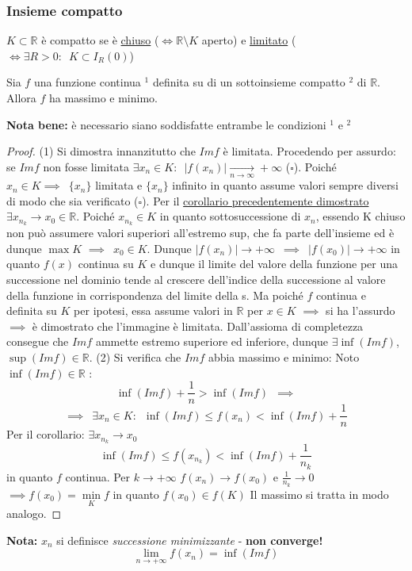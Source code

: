 \documentclass[10pt, oneside]{book}
\theoremstyle{plain}
\begin{document}
\subsubsection{Insieme compatto}
\begin{defin}
$K \subset \mathbb{R}$ è compatto se è \underline{chiuso} ($\Leftrightarrow \mathbb{R} \setminus K$ aperto) e \underline{limitato} ($\Leftrightarrow \exists R > 0 : \enspace K \subset I_R(0)$)
\end{defin}
\hypertarget{weierstrass}{\begin{ther}
Sia $f$ una funzione continua $^1$ definita su di un sottoinsieme compatto $^2$ di $\mathbb{R}$. 
Allora $f$ ha massimo e minimo.
\end{ther}}
\textbf{Nota bene: } è necessario siano soddisfatte entrambe le condizioni $^1$ e $^2$
\begin{proof}
    (1) Si dimostra innanzitutto che $Im f$ è limitata. Procedendo per assurdo: se $Im f$ non fosse limitata $\exists x_n \in K : \enspace |f(x_n)| \xrightarrow[n \rightarrow \infty]{} + \infty$ ($\square$).
    Poiché $x_n \in K \implies \enspace \{x_n\}$ limitata e $\{x_n\}$ infinito in quanto assume valori sempre diversi di modo che sia verificato ($\square$). Per il \hyperlink{corollaier}{corollario precedentemente dimostrato} $\exists x_{n_k} \rightarrow x_0 \in \mathbb{R}$. \newline Poiché $x_{n_k} \in K$ in quanto sottosuccessione di $x_n$, essendo K chiuso non può assumere valori superiori all'estremo sup, che fa parte dell'insieme ed è dunque $\max K$ $\implies \enspace x_0 \in K$. 
    \newline Dunque $|f(x_n)| \longrightarrow + \infty \enspace \implies \enspace |f(x_0)| \longrightarrow + \infty$ in quanto $f(x)$ continua su $K$ e dunque il limite del valore della funzione per una successione nel dominio tende al crescere dell'indice della successione al valore della funzione in corrispondenza del limite della s. Ma poiché $f$ continua e definita su $K$ per ipotesi, essa assume valori in $\mathbb{R}$ per $x \in K$ $\implies$ si ha l'assurdo $\implies$ è dimostrato che l'immagine è limitata. \newline 
    Dall'assioma di completezza consegue che $Im f$ ammette estremo superiore ed inferiore, dunque $\exists \inf(Im f)$, $\sup(Im f) \in \mathbb{R}$. \newline
    (2) Si verifica che $Im f$ abbia massimo e minimo: \newline
    Noto $\inf(Im f) \in \mathbb{R}$ :
    \[\inf(Im f) + \frac{1}{n} > \inf(Im f) \enspace \implies\]
    \[\implies \enspace \exists x_n \in K : \enspace \inf(Im f) \leq f(x_n) < \inf(Im f) + \frac{1}{n}\]
    Per il corollario: $\exists x_{n_k} \rightarrow x_0$
    \[\inf(Im f) \leq f(x_{n_k}) < \inf(Im f) + \frac{1}{n_k}\]
    in quanto $f$ continua. Per $k \rightarrow + \infty$ $f(x_n) \rightarrow f(x_0)$ e $\frac{1}{n_k} \rightarrow 0$ $\implies f(x_0) = \min \limits_K f$ in quanto $f(x_0) \in f(K)$ \newline Il massimo si tratta in modo analogo.
\end{proof}
\textbf{Nota: } $x_n$ si definisce \textit{successione minimizzante} - \textbf{non converge!}
\[\lim \limits_{n \rightarrow + \infty} f(x_n)= \inf(Im f)\]
\end{document}
